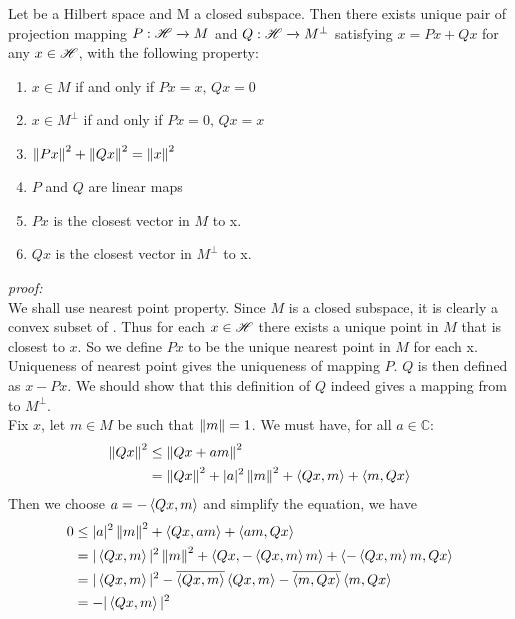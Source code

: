 \documentclass{article}
\begin{document}
\begin{proposition}\rm\nextline
	Let \hbs be a Hilbert space and M a closed subspace. Then there exists unique pair of projection mapping $P:\mathscr{H}\xrightarrow{}M$ and $Q:\mathscr{H}\xrightarrow{}M^\perp$ satisfying $x=Px+Qx$ for any $x\in\mathscr{H}$, with the following property:
	\begin{enumerate}[(1)]
		\item $x\in M$ if and only if $Px=x,\,Qx=0$
		\item $x\in M^\perp$ if and only if $Px=0,\,Qx=x$
		\item $\left\|{Px}\right\|^2+\left\|{Qx}\right\|^2=\left\|{x}\right\|^2$
		\item $P$ and $Q$ are linear maps
		\item $Px$ is the closest vector in $M$ to x.
		\item $Qx$ is the closest vector in $M^\perp$ to x.
	\end{enumerate}
	\textit{proof:}\\
	We shall use nearest point property. Since $M$ is a closed subspace, it is clearly a convex subset of \hbs. Thus for each $x\in \mathscr{H}$ there exists a unique point in $M$ that is closest to $x$. So we define $Px$ to be the unique nearest point in $M$ for each x. Uniqueness of nearest point gives the uniqueness of mapping $P$. $Q$ is then defined as $x-Px$. We should show that this definition of $Q$ indeed gives a mapping from \hbs to $M^\perp$.\\
	Fix $x$, let $m\in M$ be such that $\left\|{m}\right\|=1$. We must have, for all $a\in\mathbb{C}$:
	\begin{equation}
		\begin{split}
			\left\|{Qx}\right\|^2&\leq\left\|{Qx+am}\right\|^2\\
			&=\left\|{Qx}\right\|^2+|a|^2\left\|{m}\right\|^2+\left<{Qx},{m}\right>+\left<{m},{Qx}\right>
		\end{split}
	\end{equation}
	Then we choose $a=-\left<{Qx},{m}\right>$ and simplify the equation, we have
	\begin{equation}
		\begin{split}
			0&\leq|a|^2\left\|{m}\right\|^2+\left<{Qx},{am}\right>+\left<{am},{Qx}\right>\\
			&=|\left<{Qx},{m}\right>|^2\left\|{m}\right\|^2+\left<{Qx},{-\left<{Qx},{m}\right>m}\right>+\left<{-\left<{Qx},{m}\right>m},{Qx}\right>\\
			&=|\left<{Qx},{m}\right>|^2-
			\overline{\left<{Qx},{m}\right>}\left<{Qx},{m}\right>-
			\overline{\left<{m},{Qx}\right>}\left<{m},{Qx}\right>\\
			&=-|\left<{Qx},{m}\right>|^2
		\end{split}
	\end{equation}

\end{proposition}
\end{document}
